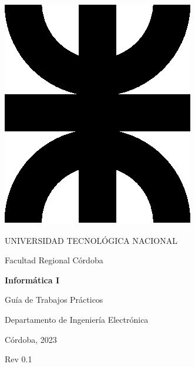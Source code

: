 \thispagestyle{empty}

\begin{center}

\includegraphics[scale=.3]{img/utn.eps}

\medskip
UNIVERSIDAD TECNOLÓGICA NACIONAL

Facultad Regional Córdoba

\vspace{3cm}

\textbf{
  \huge
  Informática I
}

\vspace{2cm}

\LARGE{Guía de Trabajos Prácticos}

\vfill

Departamento de Ingeniería Electrónica

\vspace{1cm}

Córdoba, 2023

\vspace{1cm}

Rev 0.1

\end{center}


